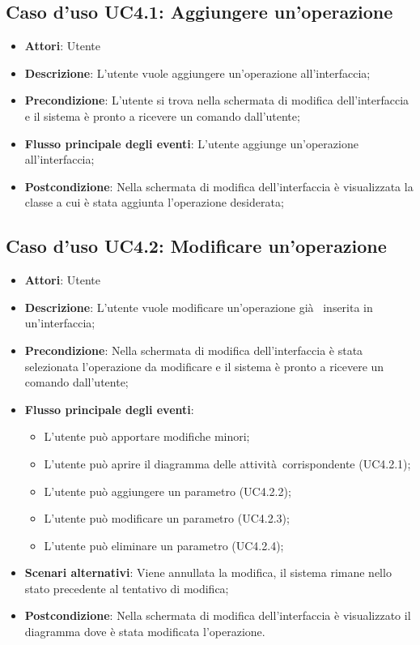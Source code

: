 \documentclass[../AnalisiDeiRequisiti.tex]{subfiles}
\begin{document}
			\subsection{Caso d'uso UC4.1: Aggiungere un'operazione}
			\begin{itemize}
				\item \textbf{Attori}: Utente
				\item \textbf{Descrizione}: L'utente vuole aggiungere un'operazione all'interfaccia;
				\item \textbf{Precondizione}: L'utente si trova nella schermata di modifica dell'interfaccia e il sistema è pronto a ricevere un comando dall'utente;
				\item \textbf{Flusso principale degli eventi}: L'utente aggiunge un'operazione all'interfaccia;
				\item \textbf{Postcondizione}: Nella schermata di modifica dell'interfaccia è visualizzata la classe a cui è stata aggiunta l'operazione desiderata;
			\end{itemize}
			\subsection{Caso d'uso UC4.2: Modificare un'operazione}
			\begin{itemize}
				\item \textbf{Attori}: Utente
				\item \textbf{Descrizione}: L'utente vuole modificare un'operazione già  inserita in un'interfaccia;
				\item \textbf{Precondizione}: Nella schermata di modifica dell'interfaccia è stata selezionata l'operazione da modificare e il sistema è pronto a ricevere un comando dall'utente;
				\item \textbf{Flusso principale degli eventi}: \begin{itemize}
					\item L'utente può apportare modifiche minori;
					\item L'utente può aprire il diagramma delle attività corrispondente (UC4.2.1);
					\item L'utente può aggiungere un parametro (UC4.2.2);
					\item L'utente può modificare un parametro (UC4.2.3);
					\item L'utente può eliminare un parametro (UC4.2.4);
				\end{itemize}
				\item \textbf{Scenari alternativi}: Viene annullata la modifica, il sistema rimane nello stato precedente al tentativo di modifica;
				\item \textbf{Postcondizione}: Nella schermata di modifica dell'interfaccia è visualizzato il diagramma dove è stata modificata l'operazione.
			\end{itemize}
\end{document}
